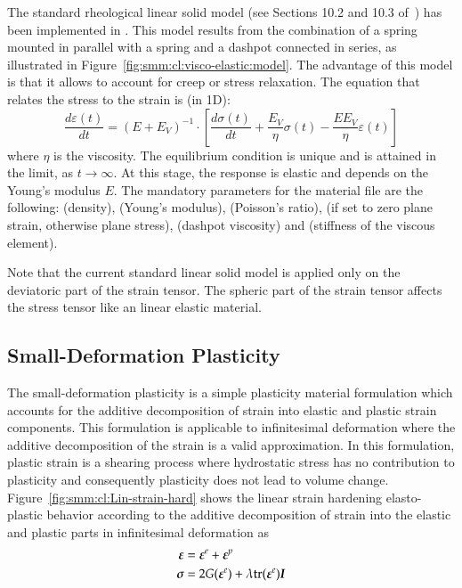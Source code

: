 The standard rheological linear solid model (see Sections 10.2 and 10.3
of~\cite{simo92}) has been implemented in \akantu. This model results from the
combination of a spring mounted in parallel with a spring and a dashpot
connected in series, as illustrated in
Figure~\ref{fig:smm:cl:visco-elastic:model}. The advantage of this model is that
it allows to account for creep or stress relaxation. The equation that relates
the stress to the strain is (in 1D):
\begin{equation}
  \frac{d\varepsilon(t)}{dt} = \left ( E + E_V \right ) ^ {-1} \cdot \left [ \frac{d\sigma(t)}{dt} + \frac{E_V}{\eta}\sigma(t) - \frac{EE_V}{\eta}\varepsilon(t) \right ]
\end{equation}
where $\eta$ is the viscosity. The equilibrium condition is unique and
is attained in the limit, as $t \to \infty $. At this stage, the
response is elastic and depends on the Young's modulus $E$.  The
mandatory parameters for the material file are the following:
 (density),  (Young's modulus),  (Poisson's
ratio),  (if set to zero plane strain, otherwise
plane stress),  (dashpot viscosity) and  (stiffness
of the viscous element).

Note that the current standard linear solid model is applied only on the deviatoric part of the strain tensor. The spheric part of the strain tensor affects the stress tensor like an linear elastic material.

\subsection{Small-Deformation Plasticity}
The small-deformation plasticity is a simple plasticity material
formulation which accounts for the additive decomposition of strain
into elastic and plastic strain components. This formulation is
applicable to infinitesimal deformation where the additive
decomposition of the strain is a valid approximation. In this
formulation, plastic strain is a shearing process where hydrostatic
stress has no contribution to plasticity and consequently plasticity
does not lead to volume change. Figure~\ref{fig:smm:cl:Lin-strain-hard}
shows the linear strain hardening elasto-plastic behavior according to
the additive decomposition of strain into the elastic and plastic
parts in infinitesimal deformation as
\begin{align}
  \boldsymbol{\varepsilon} &= \boldsymbol{\varepsilon}^e +\boldsymbol{\varepsilon}^p\\
  {\boldsymbol{\sigma}} &= 2G(\boldsymbol{\varepsilon}^e) + \lambda  \mathrm{tr}(\boldsymbol{\varepsilon}^e)\boldsymbol{I}
\end{align}

